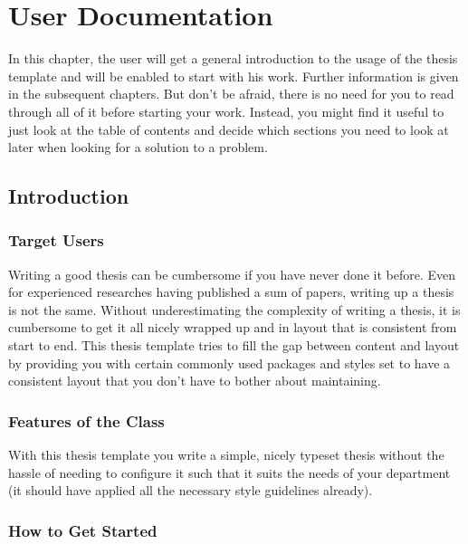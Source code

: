 \lstset{language=[LaTeX]TeX}

\chapter{User Documentation}

In this chapter, the user will get a general introduction to the usage of the thesis template and will be enabled to start with his work.
Further information is given in the subsequent chapters.
But don't be afraid, there is no need for you to read through all of it before starting your work.
Instead, you might find it useful to just look at the table of contents and decide which sections you need to look at later when looking for a solution to a problem.


\section{Introduction}\label{sec:user-documentation:introduction}

\subsection{Target Users}\label{sec:user-documentation:target-users}

Writing a good thesis can be cumbersome if you have never done it before.
Even for experienced researches having published a sum of papers, writing up a thesis is not the same.
Without underestimating the complexity of writing a thesis, it is cumbersome to get it all nicely wrapped up and in layout that is consistent from start to end.
This thesis template tries to fill the gap between content and layout by providing you with certain commonly used packages and styles set to have a consistent layout that you don't have to bother about maintaining.


\subsection{Features of the Class}\label{sec:user-documentation:features}

With this thesis template you write a simple, nicely typeset thesis without the hassle of needing to configure it such that it suits the needs of your department (it should have applied all the necessary style guidelines already).


\subsection{How to Get Started}\label{sec:user-documentation:get-started}

